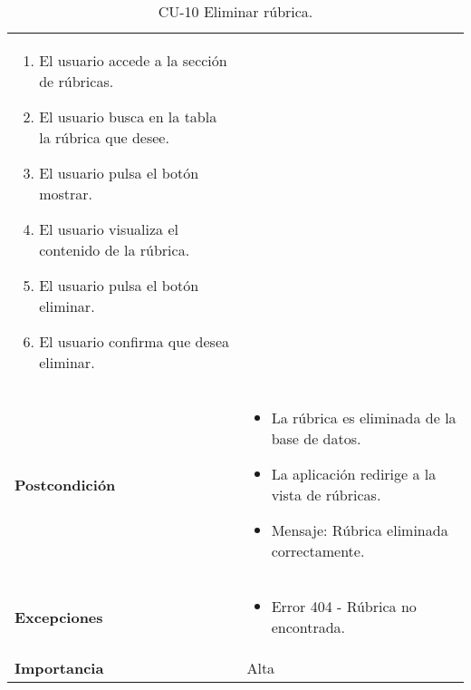 \begin{table}[p]
\begin{tabularx}{\linewidth}{ p{} p{} }
\begin{enumerate}
\begin{enumerate}
                            			\item El usuario accede a la sección de rúbricas.
                                        \item El usuario busca en la tabla la rúbrica que desee.
                            			\item El usuario pulsa el botón mostrar.
                                        \item El usuario visualiza el contenido de la rúbrica.
                                        \item El usuario pulsa el botón eliminar.
                                        \item El usuario confirma que desea eliminar.
                                    \end{enumerate}
                            		\end{enumerate} \\
		\textbf{Postcondición}        & \begin{itemize}
                                        \tightlist
		                                  \item La rúbrica es eliminada de la base de datos.
		                                  \item La aplicación redirige a la vista de rúbricas.
		                                  \item Mensaje: Rúbrica eliminada correctamente.
		                                 \end{itemize} \\
		\textbf{Excepciones}         & \begin{itemize}
                                        \tightlist
		                                  \item Error 404 - Rúbrica no encontrada.
		                                 \end{itemize} \\
		\textbf{Importancia}          & Alta \\
		\bottomrule
	\end{tabularx}
	\caption{CU-10 Eliminar rúbrica.}
	\label{tab:CU-10}
\end{table}

